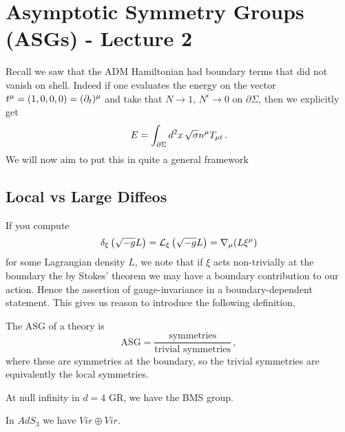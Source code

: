 \documentclass{article}
\begin{document}
\section{Asymptotic Symmetry Groups (ASGs) - Lecture 2}
Recall we saw that the ADM Hamiltonian had boundary terms that did not vanish on shell. Indeed if one evaluates the energy on the vector $t^\mu = (1,0,0,0) = (\partial_t)^\mu$ and take that $N \to 1, \, N^i \to 0$ on $\partial \Sigma$, then we explicitly get 
\[
E = \int_{\partial \Sigma} d^2x \, \sqrt{\sigma} n^\mu T_{\mu t} \, . 
\]
We will now aim to put this in quite a general framework
\subsection{Local vs Large Diffeos}
If you compute 
\[
\delta_\xi \left( \sqrt{-g} L  \right) = \mathcal{L}_\xi \left( \sqrt{-g} L \right) = \nabla_\mu (L \xi^\mu)
\] 
for some Lagrangian density $L$, we note that if $\xi$ acts non-trivially at the boundary the by Stokes' theorem we may have a boundary contribution to our action. Hence the assertion of gauge-invariance in a boundary-dependent statement. This gives us reason to introduce the following definition, 
\begin{definition}
	The ASG of a theory is 
	\[
	\text{ASG} = \frac{\text{symmetries}}{\text{trivial symmetries}} \, , 
	\]
where these are symmetries at the boundary, so the trivial symmetries are equivalently the local symmetries. 
\end{definition}

\begin{example}
	At null infinity in $d=4$ GR, we have the BMS group. 
\end{example}

\begin{example}
	In $AdS_3$ we have $Vir \oplus Vir$. 
\end{example}

\end{document}
